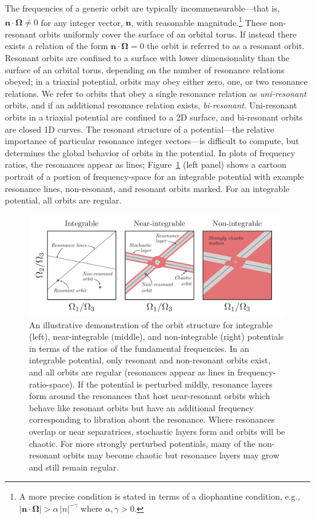 \documentclass{mn2e}
\newcommand{\bs}[1]{\boldsymbol{#1}}
\begin{document}
The frequencies of a generic orbit are typically incommensurable---that is, $\bs{n} \cdot \bs{\Omega} \neq 0$ for any integer vector, $\bs{n}$, with reasonable magnitude.\footnote{A more precise condition is stated in terms of a diophantine condition, e.g., $|\bs{n} \cdot \boldsymbol{\Omega}| > \alpha \, |n|^{-\gamma}$ where $\alpha, \gamma>0$.} These non-resonant orbits uniformly cover the surface of an orbital torus. If instead there exists a relation of the form $\boldsymbol{n} \cdot \boldsymbol{\Omega} = 0$ the orbit is referred to as a resonant orbit. Resonant orbits are confined to a surface with lower dimensionality than the surface of an orbital torus, depending on the number of resonance relations obeyed; in a triaxial potential, orbits may obey either zero, one, or two resonance relations. We refer to orbits that obey a single resonance relation as \emph{uni-resonant} orbits, and if an additional resonance relation exists, \emph{bi-resonant}. Uni-resonant orbits in a triaxial potential are confined to a 2D surface, and bi-resonant orbits are closed 1D curves. The resonant structure of a potential---the relative importance of particular resonance integer vectors---is difficult to compute, but determines the global behavior of orbits in the potential. In plots of frequency ratios, the resonances appear as lines; Figure~\ref{fig:cartoons} (left panel) shows a cartoon portrait of a portion of frequency-space for an integrable potential with example resonance lines, non-resonant, and resonant orbits marked. For an integrable potential, all orbits are regular.

\begin{figure}[h]
\begin{center}
\includegraphics[width=\textwidth]{figures/cartoons.pdf}
\caption{An illustrative demonstration of the orbit structure for integrable (left), near-integrable (middle), and non-integrable (right) potentials in terms of the ratios of the fundamental frequencies. In an integrable potential, only resonant and non-resonant orbits exist, and all orbits are regular (resonances appear as lines in frequency-ratio-space). If the potential is perturbed mildly, resonance layers form around the resonances that host near-resonant orbits which behave like resonant orbits but have an additional frequency corresponding to libration about the resonance. Where resonances overlap or near separatrices, stochastic layers form and orbits will be chaotic. For more strongly perturbed potentials, many of the non-resonant orbits may become chaotic but resonance layers may grow and still remain regular. }
\label{fig:cartoons}
\end{center}
\end{figure}
\end{document}

